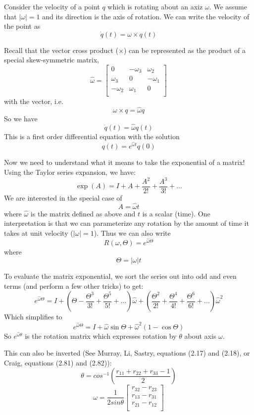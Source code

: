 Consider the velocity of a point $q$ which is rotating about an axiz $\omega$.  We assume that
$|\omega|=1$ and its direction is the axis of rotation. We can write the velocity of the point as
\[
\dot{q}(t)=\omega \times q(t)
\]

Recall that the vector cross product ($\times$) can be represented as the product of a special
skew-symmetric matrix,
\[
\hat{\omega} = \left[
\begin{array}{ccc}
0               &       -\omega_3       &       \omega_2      \\
\omega_3        &       0               &       -\omega_1     \\
-\omega_2       &       \omega_1        &       0             \\
\end{array}
\right]
\]
with the vector, i.e.
\[
\omega \times q = \hat{\omega} q
\]
So we have
\[
\dot{q}(t)=\hat{\omega} q(t)
\]
This is a first order differential equation with the solution
\[
q(t) = e^{\hat{\omega}t}q(0)
\]

Now we need to understand what it means to take the exponential of a matrix!
Using the Taylor series expansion, we have:
\[
\exp(A) = I + A + \frac{A^2}{2!} + \frac{A^3}{3!} + ...
\]
We are interested in the special case of
\[
A = \hat{\omega}t
\]
where $\hat{\omega}$ is the matrix defined as above and $t$ is a scalar (time).
One interpretation is that we can parameterize any rotation by the amount of time
it takes at unit velocity ($|\omega|=1$). Thus we can also write
\[
R(\omega,\Theta) = e^{\hat{\omega}\Theta}
\]
where
\[
\Theta = |\omega|t
\]

To evaluate the matrix exponential, we sort the series out into odd and even terms (and perform
a few other tricks) to get:
\[
e^{\hat{\omega}\Theta} =
    I
 +
    \left(
       \Theta - \frac{\Theta^3}{3!} + \frac{\Theta^5}{5!} + \dots
    \right)\hat{\omega}
 +
    \left(
       \frac{\Theta^2}{2!} + \frac{\Theta^4}{4!} + \frac{\Theta^6}{6!} + \dots
    \right)\hat{\omega}^2
\]
Which simplifies to
\[
e^{\hat{\omega}\Theta} = I + \hat{\omega} \sin \Theta + \hat{\omega}^2(1-\cos\Theta)
\]
So $e^{\hat{\omega}\theta}$ is the rotation matrix which expresses rotation by $\theta$ about
axis $\omega$.

This can also be inverted (See Murray, Li, Sastry, equations (2.17) and (2.18),
or Craig, equations (2.81) and (2.82)):
\begin{equation}\label{thetainverse}
\theta = cos^{-1} \left(
        \frac {r_{11} + r_{22} + r_{33} -1}
              {2}
        \right)
\end{equation}
\begin{equation}\label{omegainverse}
\omega = \frac{1}{2sin\theta} \left[
        \begin{array}{c}
        r_{32}-r_{23}   \\
        r_{13}-r_{31}   \\
        r_{21}-r_{12}   \\
        \end{array}
        \right]
\end{equation}





